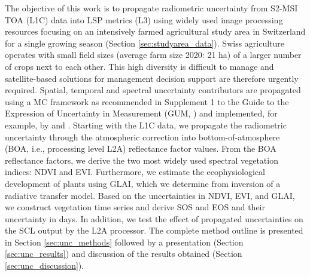 The objective of this work is to propagate radiometric uncertainty from \gls{S2}-\gls{MSI} \gls{TOA} (L1C) data into \gls{LSP} metrics (L3) using widely used image processing resources focusing on an intensively farmed agricultural study area in Switzerland for a single growing season (Section \ref{sec:studyarea_data}). Swiss agriculture operates with small field sizes (average farm size 2020: 21 ha) of a larger number of crops next to each other. This high diversity is difficult to manage and satellite-based solutions for management decision support are therefore urgently required.
Spatial, temporal and spectral uncertainty contributors are propagated using a \gls{MC} framework as recommended in Supplement 1 to the Guide to the Expression of Uncertainty in Measurement (GUM, \citep{bipm_supplement_2008}) and implemented, for example, by \cite{gorrono_radiometric_2017} and \cite{gorrono_providing_2018}. Starting with the L1C data, we propagate the radiometric uncertainty through the atmospheric correction into bottom-of-atmosphere (BOA, i.e., processing level L2A) reflectance factor values. From the BOA reflectance factors, we derive the two most widely used spectral vegetation indices: \gls{NDVI} and EVI. Furthermore, we estimate the ecophysiological development of plants using \gls{GLAI}, which we determine from inversion of a radiative transfer model. Based on the uncertainties in \gls{NDVI}, \gls{EVI}, and \gls{GLAI}, we construct vegetation time series and derive \gls{SOS} and \gls{EOS} and their uncertainty in days. In addition, we test the effect of propagated uncertainties on the \gls{SCL} output by the L2A processor. The complete method outline is presented in Section \ref{sec:unc_methods} followed by a presentation (Section \ref{sec:unc_results}) and discussion of the results obtained (Section \ref{sec:unc_discussion}).

